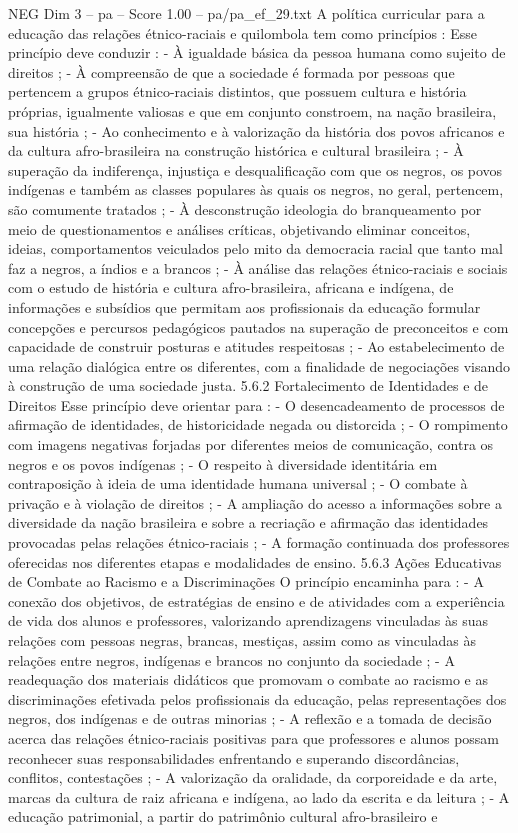 \begin{textsample}{NEG Dim 3 – pa – Score 1.00 – pa/pa\_ef\_29.txt}
A política curricular para a educação das relações étnico-raciais e quilombola tem como princípios : Esse princípio deve conduzir : - À igualdade básica da pessoa humana como sujeito de direitos ; - À compreensão de que a sociedade é formada por pessoas que pertencem a grupos étnico-raciais distintos, que possuem cultura e história próprias, igualmente valiosas e que em conjunto constroem, na nação brasileira, sua história ; - Ao conhecimento e à valorização da história dos povos africanos e da cultura afro-brasileira na construção histórica e cultural brasileira ; - À superação da indiferença, injustiça e desqualificação com que os negros, os povos indígenas e também as classes populares às quais os negros, no geral, pertencem, são comumente tratados ; - À desconstrução ideologia do branqueamento por meio de questionamentos e análises críticas, objetivando eliminar conceitos, ideias, comportamentos veiculados pelo mito da democracia racial que tanto mal faz a negros, a índios e a brancos ; - À análise das relações étnico-raciais e sociais com o estudo de história e cultura afro-brasileira, africana e indígena, de informações e subsídios que permitam aos profissionais da educação formular concepções e percursos pedagógicos pautados na superação de preconceitos e com capacidade de construir posturas e atitudes respeitosas ; - Ao estabelecimento de uma relação dialógica entre os diferentes, com a finalidade de negociações visando à construção de uma sociedade justa. 5.6.2 Fortalecimento de Identidades e de Direitos Esse princípio deve orientar para : - O desencadeamento de processos de afirmação de identidades, de historicidade negada ou distorcida ; - O rompimento com imagens negativas forjadas por diferentes meios de comunicação, contra os negros e os povos indígenas ; - O respeito à diversidade identitária em contraposição à ideia de uma identidade humana universal ; - O combate à privação e à violação de direitos ; - A ampliação do acesso a informações sobre a diversidade da nação brasileira e sobre a recriação e afirmação das identidades provocadas pelas relações étnico-raciais ; - A formação continuada dos professores oferecidas nos diferentes etapas e modalidades de ensino. 5.6.3 Ações Educativas de Combate ao Racismo e a Discriminações O princípio encaminha para : - A conexão dos objetivos, de estratégias de ensino e de atividades com a experiência de vida dos alunos e professores, valorizando aprendizagens vinculadas às suas relações com pessoas negras, brancas, mestiças, assim como as vinculadas às relações entre negros, indígenas e brancos no conjunto da sociedade ; - A readequação dos materiais didáticos que promovam o combate ao racismo e as discriminações efetivada pelos profissionais da educação, pelas representações dos negros, dos indígenas e de outras minorias ; - A reflexão e a tomada de decisão acerca das relações étnico-raciais positivas para que professores e alunos possam reconhecer suas responsabilidades enfrentando e superando discordâncias, conflitos, contestações ; - A valorização da oralidade, da corporeidade e da arte, marcas da cultura de raiz africana e indígena, ao lado da escrita e da leitura ; - A educação patrimonial, a partir do patrimônio cultural afro-brasileiro e 
\end{textsample}
